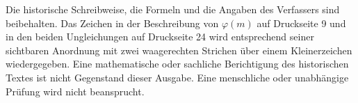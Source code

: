 Die historische Schreibweise, die Formeln und die Angaben des Verfassers sind beibehalten. Das Zeichen in der Beschreibung von \(\varphi(m)\) auf Druckseite 9 und in den beiden Ungleichungen auf Druckseite 24 wird entsprechend seiner sichtbaren Anordnung mit zwei waagerechten Strichen über einem Kleinerzeichen wiedergegeben. Eine mathematische oder sachliche Berichtigung des historischen Textes ist nicht Gegenstand dieser Ausgabe. Eine menschliche oder unabhängige Prüfung wird nicht beansprucht.
